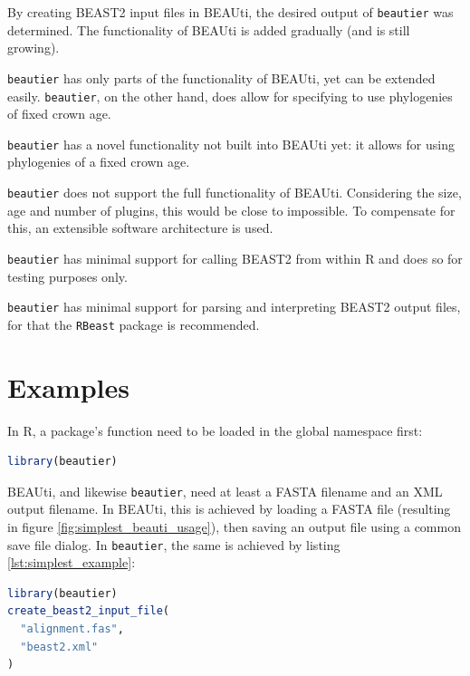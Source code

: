 \documentclass{article}
\begin{document}
By creating BEAST2 input files in BEAUti, 
the desired output of \verb;beautier; was determined. 
The functionality of BEAUti is added gradually (and is still growing).

\verb;beautier; has only parts of the functionality of BEAUti, yet
can be extended easily. \verb;beautier;, on the other hand, does allow for specifying
to use phylogenies of fixed crown age.

\verb;beautier; has a novel functionality not built into BEAUti yet:
it allows for using phylogenies of a fixed crown age. 

\verb;beautier; does not support the full functionality of BEAUti. Considering
the size, age and number of plugins, this would be close to impossible.
To compensate for this, an extensible software architecture is used.

\verb;beautier; has minimal support for calling BEAST2 from within R and does
so for testing purposes only. 

\verb;beautier; has minimal support for parsing and interpreting BEAST2 output files,
for that the \verb;RBeast; \cite{RBeast} package is recommended.

\section{Examples}

In R, a package's function need to be loaded in the global namespace first:

\begin{lstlisting}[language=R, caption=Loading, label=lst:loading_beautier, floatplacement=H]
library(beautier)
\end{lstlisting}

BEAUti, and likewise \verb;beautier;, need at least a FASTA filename
and an XML output filename. In BEAUti, this is achieved by loading a FASTA file (resulting
in figure \ref{fig:simplest_beauti_usage}), then saving an output file using a common
save file dialog. In \verb;beautier;, the same is achieved by listing \ref{lst:simplest_example}:

\begin{lstlisting}[language=R, caption=Simplest example, label=lst:simplest_example, floatplacement=H]
library(beautier)
create_beast2_input_file(
  "alignment.fas",
  "beast2.xml"
)
\end{lstlisting}
\end{document}
